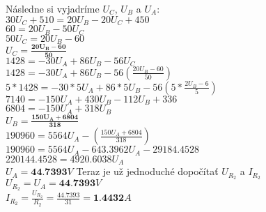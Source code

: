 Následne si vyjadríme $U_C$, $U_B$ a $U_A$: \\
\newline
$30U_C + 510 = 20U_B - 20U_C + 450$ \\
$60 = 20U_B - 50U_C$ \\
$50U_C = 20U_B - 60$ \\
$U_C = \boldsymbol{\frac{20U_B - 60}{50}}$ \\
\newline
$1428 = -30U_A + 86U_B - 56U_C$ \\
$1428 = -30U_A + 86U_B - 56(\frac{20U_B - 60}{50})$ \\
$5*1428 = -30*5U_A + 86*5U_B - 56(5*\frac{2U_B - 6}{5})$ \\
$7140 = -150U_A + 430 U_B - 112U_B + 336$ \\
$6804 = -150U_A + 318U_B$ \\
$U_B = \boldsymbol{\frac{150U_A + 6804}{318}}$ \\
\newline
$190960 = 5564U_A - (\frac{150U_A + 6804}{318})$ \\
$190960 = 5564U_A - 643.3962U_A - 29184.4528$ \\
$220144.4528 = 4920.6038U_A$ \\
$U_A = \textbf{44.7393}V$
\newline
\newline
Teraz je už jednoduché dopočítať $U_{R_2}$ a $I_{R_2}$ \\
\newline
$U_{R_2} = U_A = \textbf{44.7393}V$ \\
$I_{R_2} = \frac{U_{R_2}}{R_2} = \frac{44.7393}{31} = \textbf{1.4432}A$ \\

